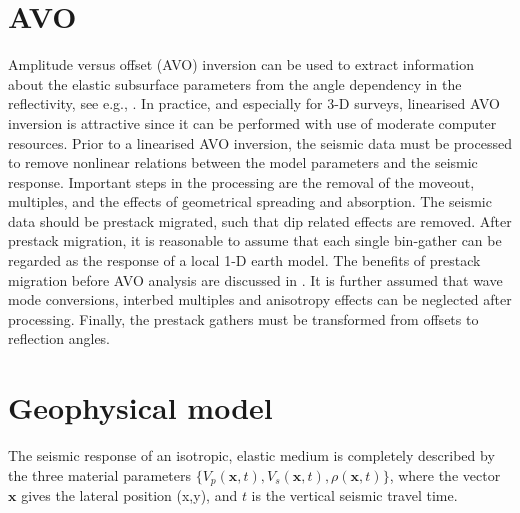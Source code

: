 \documentclass[screen,citenumeric,long,10pt]{nrdoc_060418}
\newcommand{\vect}[1]{\ensuremath{\mathbf{#1}}}
\newcommand{\vp}{\ensuremath{V_p}\xspace}      %
\newcommand{\vs}{\ensuremath{V_s}\xspace}      %
\begin{document}
\begin{multicols}{2}
\section{AVO}
Amplitude versus offset (AVO) inversion can be used to extract
information about the elastic subsurface parameters from the angle
dependency in the reflectivity, see e.g., 
\cite{hamp90,lort93,pan94,bula96b}. In practice, and especially for
3-D surveys, linearised AVO inversion is attractive since it can be
performed with use of moderate computer resources. Prior to a
linearised AVO inversion, the seismic data must be processed to remove
nonlinear relations between the model parameters and the seismic
response. Important steps in the processing are the removal of the
moveout, multiples, and the effects of geometrical spreading and
absorption. The seismic data should be prestack migrated, such that
dip related effects are removed. After prestack migration, it is
reasonable to assume that each single bin-gather can be regarded as
the response of a local 1-D earth model. The benefits of prestack
migration before AVO analysis are discussed in
\cite{brow92,mosh96,bula2001d}. It is further assumed that wave mode
conversions, interbed multiples and  anisotropy effects can be
neglected after processing.  Finally, the prestack gathers must be
transformed from offsets to reflection angles.

\section{Geophysical model}

The seismic response of an isotropic, elastic medium is completely
described by the three material parameters $\{\vp(\vect{x},t),
\vs(\vect{x},t), \rho(\vect{x},t)\}$, where the vector $\vect{x}$
gives the lateral position (x,y), and $t$ is the vertical seismic
travel time.  


\end{multicols}
\end{document}
